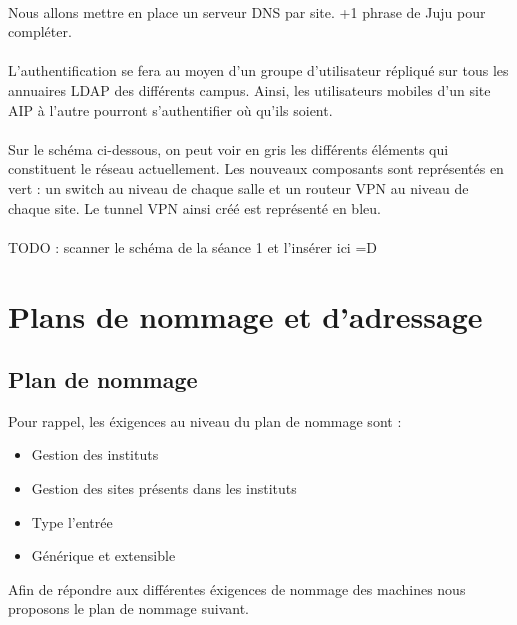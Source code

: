 \documentclass[a4paper]{article}
\begin{document}
	\paragraph*{} %
	Nous allons mettre en place un serveur DNS par site. +1 phrase de Juju pour compléter. 
	
	\paragraph*{} %
	L'authentification se fera au moyen d'un groupe d'utilisateur répliqué sur tous les annuaires LDAP des différents campus. Ainsi, les utilisateurs mobiles d'un site AIP à l'autre pourront s'authentifier où qu'ils soient. 
	
	\paragraph*{} %
	Sur le schéma ci-dessous, on peut voir en gris les différents éléments qui constituent le réseau actuellement. Les nouveaux composants sont représentés en vert : un switch au niveau de chaque salle et un routeur VPN au niveau de chaque site. Le tunnel VPN ainsi créé est représenté en bleu. 
	
	\paragraph*{} %
	TODO : scanner le schéma de la séance 1 et l'insérer ici =D 

	
\section{Plans de nommage et d'adressage}
	\subsection{Plan de nommage}

	Pour rappel, les éxigences au niveau du plan de nommage sont :\\
	\begin{itemize}
	\item Gestion des instituts
	\item Gestion des sites présents dans les instituts
	\item Type l'entrée
	\item Générique et extensible
	\end{itemize}	

	Afin de répondre aux différentes éxigences de nommage des machines nous proposons le plan de nommage suivant.	
	
\end{document}
